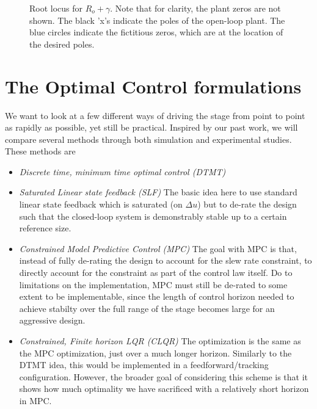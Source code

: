 \documentclass[journal,12pt,twocolumn,twoside]{IEEEtran/IEEEtran}
\begin{document}
\begin{figure}
  
  \caption{Root locus for $R_o + \gamma$. Note that for clarity, the plant zeros are not shown. The black 'x's indicate the poles of the open-loop plant. The blue circles indicate the fictitious zeros, which are at the location of the desired poles. }
  \label{fig:lqr_locus}
\end{figure}

\section{The Optimal Control formulations}
We want to look at a few different ways of driving the stage from point to point as rapidly as possible, yet still be practical. Inspired by our past work, we will compare several methods through both simulation and experimental studies. These methods are
\begin{itemize}
\item\emph{Discrete time, minimum time optimal control (DTMT)}
\item\emph{Saturated Linear state feedback (SLF)} The basic idea here to use standard linear state feedback which is saturated (on $\Delta u$) but to de-rate the design such that the closed-loop system is demonstrably stable up to a certain reference size. 
\item\emph{Constrained Model Predictive Control (MPC)} The goal with MPC is that, instead of fully de-rating the design to account for the slew rate constraint, to directly account for the constraint as part of the control law itself. Do to limitations on the implementation, MPC must still be de-rated to some extent to be implementable, since the length of control horizon needed to achieve stabilty over the full range of the stage becomes large for an aggressive design.
\item\emph{Constrained, Finite horizon LQR (CLQR)} The optimization is the same as the MPC optimization, just over a much longer horizon. Similarly to the DTMT idea, this would be implemented in a feedforward/tracking configuration. However, the broader goal of considering this scheme is that it shows how much optimality we have sacrificed with a relatively short horizon in MPC.
\end{itemize}
\end{document}
